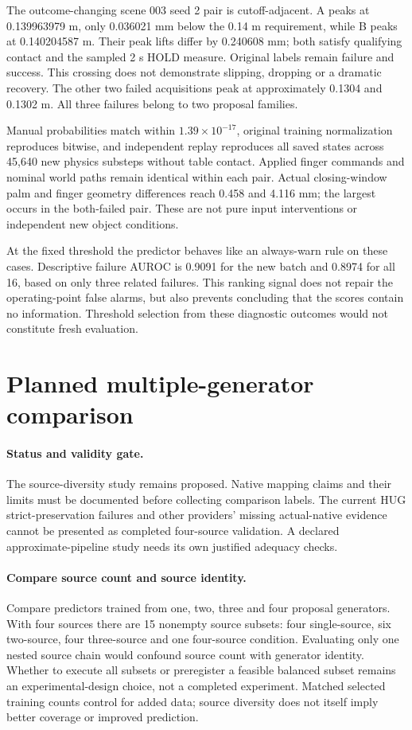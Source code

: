 \documentclass[10pt,letterpaper]{article}
\begin{document}
The outcome-changing scene 003 seed 2 pair is cutoff-adjacent. A peaks at
0.139963979 m, only 0.036021 mm below the 0.14 m requirement, while B peaks at
0.140204587 m. Their peak lifts differ by 0.240608 mm; both satisfy qualifying
contact and the sampled 2 s HOLD measure. Original labels remain failure and
success. This crossing does not demonstrate slipping, dropping or a dramatic
recovery. The other two failed acquisitions peak at approximately 0.1304 and
0.1302 m. All three failures belong to two proposal families.

Manual probabilities match within $1.39\times10^{-17}$, original training
normalization reproduces bitwise, and independent replay reproduces all saved
states across 45,640 new physics substeps without table contact. Applied finger
commands and nominal world paths remain identical within each pair. Actual
closing-window palm and finger geometry differences reach 0.458 and 4.116 mm;
the largest occurs in the both-failed pair. These are not pure input
interventions or independent new object conditions.

At the fixed threshold the predictor behaves like an always-warn rule on these
cases. Descriptive failure AUROC is 0.9091 for the new batch and 0.8974 for all
16, based on only three related failures. This ranking signal does not repair
the operating-point false alarms, but also prevents concluding that the scores
contain no information. Threshold selection from these diagnostic outcomes
would not constitute fresh evaluation.

\section{Planned multiple-generator comparison}
\paragraph{Status and validity gate.}
The source-diversity study remains proposed. Native mapping claims and their
limits must be documented before collecting comparison labels. The current
HUG strict-preservation failures and other providers' missing actual-native
evidence cannot be presented as completed four-source validation. A declared
approximate-pipeline study needs its own justified adequacy checks.

\paragraph{Compare source count and source identity.}
Compare predictors trained from one, two, three and four proposal generators.
With four sources there are 15 nonempty source subsets: four single-source,
six two-source, four three-source and one four-source condition. Evaluating
only one nested source chain would confound source count with generator identity.
Whether to execute all subsets or preregister a feasible balanced subset remains
an experimental-design choice, not a completed experiment. Matched selected
training counts control for added data; source diversity does not itself imply
better coverage or improved prediction.
\end{document}
